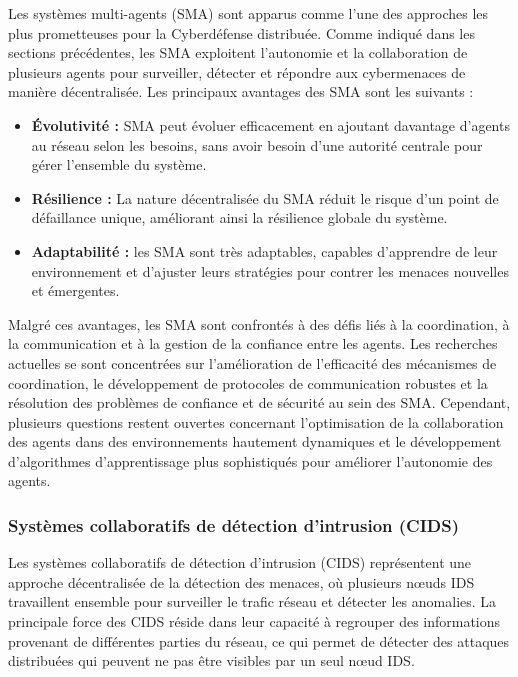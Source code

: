 Les systèmes multi-agents (SMA) sont apparus comme l'une des approches les plus prometteuses pour la Cyberdéfense distribuée. Comme indiqué dans les sections précédentes, les SMA exploitent l'autonomie et la collaboration de plusieurs agents pour surveiller, détecter et répondre aux cybermenaces de manière décentralisée. Les principaux avantages des SMA sont les suivants :

\begin{itemize}
    \item \textbf{Évolutivité :} SMA peut évoluer efficacement en ajoutant davantage d'agents au réseau selon les besoins, sans avoir besoin d'une autorité centrale pour gérer l'ensemble du système.
    \item \textbf{Résilience :} La nature décentralisée du SMA réduit le risque d'un point de défaillance unique, améliorant ainsi la résilience globale du système.
    \item \textbf{Adaptabilité :} les SMA sont très adaptables, capables d’apprendre de leur environnement et d’ajuster leurs stratégies pour contrer les menaces nouvelles et émergentes.
\end{itemize}

Malgré ces avantages, les SMA sont confrontés à des défis liés à la coordination, à la communication et à la gestion de la confiance entre les agents. Les recherches actuelles se sont concentrées sur l'amélioration de l'efficacité des mécanismes de coordination, le développement de protocoles de communication robustes et la résolution des problèmes de confiance et de sécurité au sein des SMA. Cependant, plusieurs questions restent ouvertes concernant l'optimisation de la collaboration des agents dans des environnements hautement dynamiques et le développement d'algorithmes d'apprentissage plus sophistiqués pour améliorer l'autonomie des agents.

\subsubsection{Systèmes collaboratifs de détection d'intrusion (CIDS)}

Les systèmes collaboratifs de détection d'intrusion (CIDS) représentent une approche décentralisée de la détection des menaces, où plusieurs nœuds IDS travaillent ensemble pour surveiller le trafic réseau et détecter les anomalies. La principale force des CIDS réside dans leur capacité à regrouper des informations provenant de différentes parties du réseau, ce qui permet de détecter des attaques distribuées qui peuvent ne pas être visibles par un seul nœud IDS.


